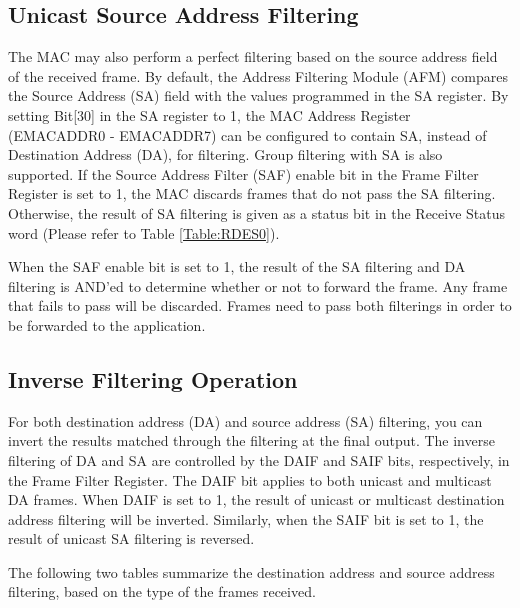 \documentclass[main\_\_EN.tex]{subfiles}
\begin{document}
\subsection{Unicast Source Address Filtering}
The MAC may also perform a perfect filtering based on the source address field of the received frame. By default, the Address Filtering Module (AFM) compares the Source Address (SA) field with the values programmed in the SA register. By setting Bit[30] in the SA register to 1, the MAC Address Register (EMACADDR0 - EMACADDR7) can be configured to contain SA, instead of Destination Address (DA), for filtering. Group filtering with SA is also supported. If the Source Address Filter (SAF) enable bit in the Frame Filter Register is set to 1, the MAC discards frames that do not pass the SA filtering. Otherwise, the result of SA filtering is given as a status bit in the Receive Status word (Please refer to Table \ref{Table:RDES0}).

When the SAF enable bit is set to 1, the result of the SA filtering and DA filtering is AND'ed to determine whether or not to forward the frame. Any frame that fails to pass will be discarded. Frames need to pass both filterings in order to be forwarded to the application.

\subsection{Inverse Filtering Operation}
For both destination address (DA) and source address (SA) filtering, you can invert the results matched through the filtering at the final output. The inverse filtering of DA and SA are controlled by the DAIF and SAIF bits, respectively, in the Frame Filter Register. The DAIF bit applies to both unicast and multicast DA frames. When DAIF is set to 1, the result of unicast or multicast destination address filtering will be inverted. Similarly, when the SAIF bit is set to 1, the result of unicast SA filtering is reversed.

The following two tables summarize the destination address and source address filtering, based on the type of the frames received.
\end{document}
